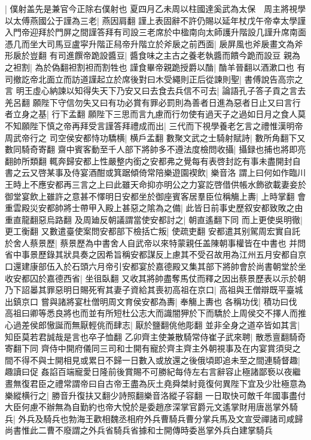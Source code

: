 |{
	僕射盖先是兼官今正除右僕射也}
夏四月乙未周以柱國達奚武為太保　周主將視學以太傅燕國公于謹為三老|{
	燕因肩翻}
謹上表固辭不許仍賜以延年杖戊午帝幸太學謹入門帝迎拜於門屏之間謹答拜有司設三老席於中楹南向太師護升階設几謹升席南面憑几而坐大司馬豆盧寜升階正舄帝升階立於斧扆之前西面|{
	扆屏風也斧扆畫文為斧形扆於豈翻}
有司進饌帝跪設醬豆|{
	醬食味之主古之養老執醬而饋今跪而設豆}
親為之袒割|{
	為於偽翻袒割袒而割牲也}
謹食畢帝親跪授爵以酳|{
	酳羊晉翻以酒漱口也}
有司撤訖帝北面立而訪道謹起立於席後對曰木受繩則正后從諫則聖|{
	書傅說告高宗之言}
明王虛心納諫以知得失天下乃安又曰去食去兵信不可去|{
	論語孔子答子貢之言去羌呂翻}
願陛下守信勿失又曰有功必賞有罪必罰則為善者日進為惡者日止又曰言行者立身之基|{
	行下孟翻}
願陛下三思而言九慮而行勿使有過天子之過如日月之食人莫不知願陛下慎之帝再拜受言謹答拜禮成而出|{
	三代而下視學養老乞言之禮惟漢明帝周武帝行之}
司空侯安都恃功驕横|{
	横戶孟翻}
數聚文武之士騎射賦詩|{
	數所角翻下又數同騎奇寄翻}
齋中賓客動至千人部下將帥多不遵法度檢問收攝|{
	攝録也捕也將即亮翻帥所類翻}
輒奔歸安都上性嚴整内銜之安都弗之覺每有表啓封訖有事未盡開封自書之云又啓某事及侍宴酒酣或箕踞傾倚常陪樂遊園褉飲|{
	樂音洛}
謂上曰何如作臨川王時上不應安都再三言之上曰此雖天命抑亦明公之力宴訖啓借供帳水飾欲載妻妾於御堂宴飲上雖許之意甚不懌明日安都坐於御座賓客居羣臣位稱觴上夀|{
	上時掌翻}
會重雲殿災安都帥將士帶甲入殿上甚惡之隂為之備|{
	此皆日前事史歷叙安都致敗之由重直龍翻惡烏路翻}
及周廸反朝議謂當使安都討之|{
	朝直遙翻下同}
而上更使吳明徹|{
	更工衡翻}
又數遣臺使案問安都部下檢括亡叛|{
	使疏吏翻}
安都遣其别駕周宏實自託於舍人蔡景歷|{
	蔡景歷為中書舍人自武帝以來特蒙親任盖陳朝事權皆在中書也}
并問省中事景歷錄其狀具奏之因希旨稱安都謀反上慮其不受召故用為江州五月安都自京口還建康部伍入於石頭六月帝引安都宴於嘉德殿又集其部下將帥會於尚書朝堂於坐收安都囚於嘉德西省|{
	坐徂臥翻}
又收其將帥盡奪馬仗而釋之因出蔡景歷表以示於朝乃下詔㬥其罪惡明日賜死宥其妻子資給其喪初高祖在京口|{
	高祖與王僧辯既平臺城出鎮京口}
嘗與諸將宴杜僧明周文育侯安都為夀|{
	奉觴上夀也}
各稱功伐|{
	積功曰伐}
高祖曰卿等悉良將也而並有所短杜公志大而識闇狎於下而驕於上周侯交不擇人而推心過差侯郎慠誕而無厭輕佻而肆志|{
	厭於鹽翻佻他彫翻}
並非全身之道卒皆如其言|{
	知臣莫若君誠哉是言也卒子恤翻}
乙卯齊主使兼散騎常侍崔子武來聘|{
	散悉亶翻騎奇寄翻下同}
齊侍中開府儀同三司和士開有寵於齊主齊主外朝視事及在内宴賞須臾之間不得不與士開相見或累日不歸一日數入或放還之後俄頃即追未至之間連騎督趣|{
	趣讀曰促}
姦諂百端寵愛日隆前後賞賜不可勝紀每侍左右言辭容止極諸鄙䙝以夜繼晝無復君臣之禮常謂帝曰自古帝王盡為灰土堯舜桀紂竟復何異陛下宜及少壯極意為樂縱横行之|{
	勝音升復扶又翻少詩照翻樂音洛縱子容翻}
一日取快可敵千年國事盡付大臣何慮不辦無為自勤約也帝大悅於是委趙彦深掌官爵元文遙掌財用唐邕掌外騎兵|{
	外兵及騎兵也勃海王歡相魏丞相府外兵曹騎兵曹分掌兵馬及文宣受禪諸司咸歸尚書惟此二曹不廢謂之外兵省騎兵省據和士開傳時委邕掌外兵白建掌騎兵}
